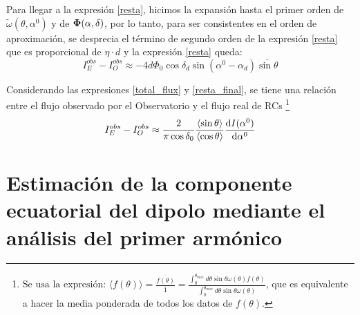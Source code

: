     Para llegar a la expresión \ref{resta}, hicimos la expansión hasta el primer orden de $\tilde{\omega}(\theta, \alpha^0)$ y de $\bf\Phi(\alpha, \delta)$, por lo tanto, para ser consistentes en el orden de aproximación, se desprecia el término de segundo orden de la expresión \ref{resta} que es proporcional de $\eta \cdot d$ y la expresión \ref{resta} queda:
        \begin{equation}
            I^{obs}_E -  I^{obs}_O \approx -4d \Phi_0 \cos\delta_d \sin(\alpha^0  - \alpha_d)\overline{\sin\theta}
            \label{resta_final}
        \end{equation}



    Considerando las expresiones \ref{total_flux} y \ref{resta_final}, se tiene una relación entre el flujo observado por el Observatorio  y el flujo real de RCs \footnote{
    $
        \text{Se usa la expresión:  }
        \langle f(\theta) \rangle = \frac{\overline{f(\theta)}}{\overline{1}} = \displaystyle\frac{\int_{0}^{\theta_{max}} d \theta \sin\theta \omega(\theta) f(\theta) }{\int_{0}^{\theta_{max}} d \theta \sin\theta \omega(\theta)} 
    $,  
    que es equivalente a hacer la media ponderada de todos los datos de $f(\theta)$.} %
    \begin{equation}
        I^{obs}_E -  I^{obs}_O \approx  \frac{2}{\pi \cos \delta_0} \frac{\langle\sin\theta \rangle}{\langle\cos\theta \rangle}\dv{I(\alpha^0)}{\alpha^0} 
        \label{eq:final}
    \end{equation}
   

\section{Estimación de la componente ecuatorial del dipolo mediante el análisis del  primer armónico}

